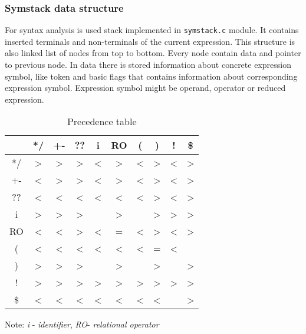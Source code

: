 \subsubsection{Symstack data structure}
For syntax analysis is used stack implemented in \verb|symstack.c| module. It contains inserted terminals and non-terminals of the current expression. This structure is also linked list of nodes from top to bottom. Every node contain data and pointer to previous node. In data there is stored information about concrete expression symbol, like token and basic flags that contains information about corresponding expression symbol. Expression symbol might be operand, operator or reduced expression.  

\begin{table}[ht]
\centering
\label{table:precedence}
\begin{tabular}{| c | c c c | c c c | c c c |}
    \hline
        & */ & +- & ?? & i & RO &  (  &  )  & ! & \$ \\
    \hline
    */ & \textgreater & \textgreater & \textgreater & \textless & \textgreater & \textless & \textgreater & \textless & \textgreater \\
    +- & \textless & \textgreater & \textgreater  & \textless & \textgreater & \textless & \textgreater & \textless & \textgreater \\
    ?? & \textless & \textless & \textless & \textless & \textless & \textless & \textgreater & \textless & \textgreater \\
    \hline
    i  &  \textgreater & \textgreater & \textgreater &  & \textgreater &  & \textgreater & \textgreater & \textgreater \\
     RO & \textless & \textless & \textgreater & \textless & = & \textless & \textgreater & \textless & \textgreater \\
    (  & \textless & \textless & \textless & \textless & \textless & \textless & = & \textless &  \\
    \hline
    )  & \textgreater & \textgreater & \textgreater &  & \textgreater &  & \textgreater &  & \textgreater \\
    !  & \textgreater & \textgreater & \textgreater & \textgreater & \textgreater & \textgreater & \textgreater & \textgreater & \textgreater \\
    \$ & \textless & \textless & \textless & \textless & \textless & \textless & \textless &  & \textgreater \\
    \hline
\end{tabular}
\caption{Precedence table}
\begin{center}    
    \begin{minipage}{8cm}
          \small
          Note:
          \textit{i} - \textit{identifier},
          \textit{RO}- \textit{relational operator}
    \end{minipage}
\end{center}
\end{table}



